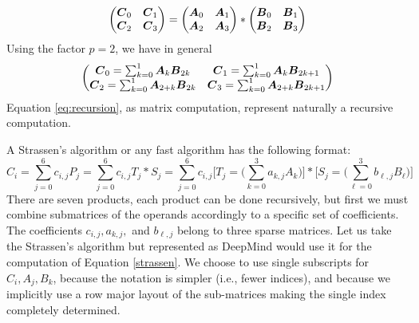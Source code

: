 \documentclass[acmsmall]{acmart}
\begin{document}
\begin{equation}
  \label{basic}
  \begin{pmatrix}
    {\boldsymbol C}_0 & {\boldsymbol C}_1 \\
    {\boldsymbol C}_2 & {\boldsymbol C}_3 \\
  \end{pmatrix} =
  \begin{pmatrix}
    {\boldsymbol A}_0 & {\boldsymbol A}_1 \\
    {\boldsymbol A}_2 & {\boldsymbol A}_3 \\
  \end{pmatrix} *
  \begin{pmatrix}
    {\boldsymbol B}_0 & {\boldsymbol B}_1 \\
    {\boldsymbol B}_2 & {\boldsymbol B}_3 \\
  \end{pmatrix} 
\end{equation}
Using the factor $p=2$, we have in general
\begin{equation}
  \label{eq:recursion}
  \begin{pmatrix} 
    {\boldsymbol C}_0 = \sum_{k=0}^{1}{\boldsymbol A}_k    {\boldsymbol B}_{2k} &
    {\boldsymbol C}_1 = \sum_{k=0}^{1}{\boldsymbol A}_k    {\boldsymbol B}_{2k+1} \\
    {\boldsymbol C}_2 = \sum_{k=0}^{1}{\boldsymbol A}_{2+k} {\boldsymbol B}_{2k} &
    {\boldsymbol C}_3 = \sum_{k=0}^{1}{\boldsymbol A}_{2+k} {\boldsymbol B}_{2k+1} \\
  \end{pmatrix}
\end{equation}
Equation \ref{eq:recursion}, as matrix computation, represent naturally
a recursive computation.

A Strassen's algorithm or any fast algorithm has the following format:
\begin{equation}
  \label{strassen}
C_i = \sum_{j=0}^6 c_{i,j}P_j =\sum_{j=0}^6 c_{i,j}T_j*S_j  
=\sum_{j=0}^6 c_{i,j}\Big[ T_j = \big(\sum_{k=0}^3
  a_{k,j}A_k\big)\Big]* \Big[S_j = \big(\sum_{\ell=0}^3 b_{\ell,j}B_\ell\big) \Big]
\end{equation}
There are seven products, each product can be done recursively, but
first we must combine submatrices of the operands accordingly to a
specific set of coefficients. The coefficients $c_{i,j},a_{k,j},$ and
$b_{\ell,j}$ belong to three sparse matrices. Let us take the
Strassen's algorithm but represented as DeepMind would use it for the
computation of Equation \ref{strassen}. We choose to use single
subscripts for $C_i, A_j, B_k$, because the notation is simpler (i.e.,
fewer indices), and because we implicitly use a row major layout of
the sub-matrices making the single index completely determined.
\end{document}
